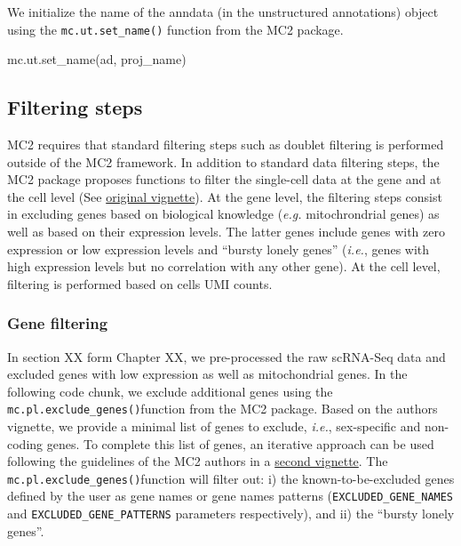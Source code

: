 \documentclass[
]{book}
\newenvironment{Shaded}{\begin{snugshade}}{\end{snugshade}}
\newcommand{\NormalTok}[1]{#1}
\begin{document}
We initialize the name of the anndata (in the unstructured annotations) object using the \texttt{mc.ut.set\_name()} function from the MC2 package.

\begin{Shaded}
\begin{Highlighting}[]
\NormalTok{mc.ut.set\_name(ad, proj\_name)}
\end{Highlighting}
\end{Shaded}

\hypertarget{filtering-steps}{%
\subsection{Filtering steps}\label{filtering-steps}}

MC2 requires that standard filtering steps such as doublet filtering is performed outside of the MC2 framework.
In addition to standard data filtering steps, the MC2 package proposes functions to filter the single-cell data at the gene and at the cell level (See \href{https://tanaylab.github.io/metacells-vignettes/one-pass.html}{original vignette}).
At the gene level, the filtering steps consist in excluding genes based on biological knowledge (\emph{e.g.} mitochrondrial genes) as well as based on their expression levels.
The latter genes include genes with zero expression or low expression levels and ``bursty lonely genes'' (\emph{i.e.}, genes with high expression levels but no correlation with any other gene).
At the cell level, filtering is performed based on cells UMI counts.

\hypertarget{gene-filtering}{%
\subsubsection*{Gene filtering}\label{gene-filtering}}

In section XX form Chapter XX, we pre-processed the raw scRNA-Seq data and excluded genes with low expression as well as mitochondrial genes.
In the following code chunk, we exclude additional genes using the \texttt{mc.pl.exclude\_genes()}function from the MC2 package.
Based on the authors vignette, we provide a minimal list of genes to exclude, \emph{i.e.}, sex-specific and non-coding genes. To complete this list of genes, an iterative approach can be used following the guidelines of the MC2 authors in a \href{https://tanaylab.github.io/metacells-vignettes/iterative.html}{second vignette}.
The \texttt{mc.pl.exclude\_genes()}function will filter out: i) the known-to-be-excluded genes defined by the user as gene names or gene names patterns (\texttt{EXCLUDED\_GENE\_NAMES} and \texttt{EXCLUDED\_GENE\_PATTERNS} parameters respectively),
and ii) the ``bursty lonely genes''.
\end{document}
